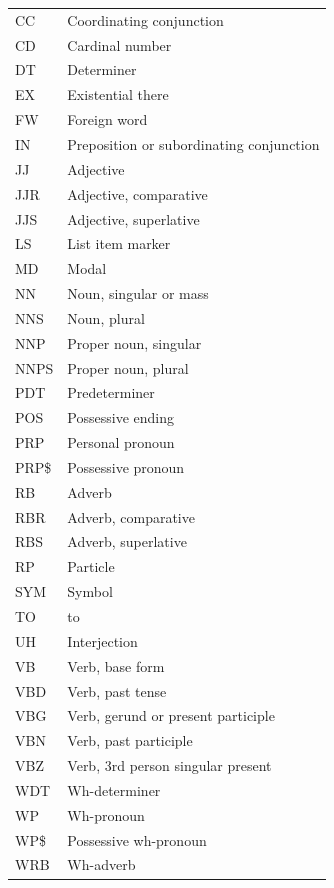 \documentclass[11pt]{article}
\begin{document}
\begin{tabular}{ll}
CC & Coordinating conjunction \\
CD & Cardinal number \\
DT & Determiner \\
EX & Existential there \\
FW & Foreign word \\
IN & Preposition or subordinating conjunction \\
JJ & Adjective \\
JJR & Adjective, comparative \\
JJS & Adjective, superlative \\
LS & List item marker \\
MD & Modal \\
NN & Noun, singular or mass \\
NNS & Noun, plural \\
NNP & Proper noun, singular \\
NNPS & Proper noun, plural \\
PDT & Predeterminer \\
POS & Possessive ending \\
PRP & Personal pronoun \\
PRP\$ & Possessive pronoun \\
RB & Adverb \\
RBR & Adverb, comparative \\
RBS & Adverb, superlative \\
RP & Particle \\
SYM & Symbol \\
TO & to \\
UH & Interjection \\
VB & Verb, base form \\
VBD & Verb, past tense \\
VBG & Verb, gerund or present participle \\
VBN & Verb, past participle \\
VBZ & Verb, 3rd person singular present \\
WDT & Wh-determiner \\
WP & Wh-pronoun \\
WP\$ & Possessive wh-pronoun \\
WRB & Wh-adverb
\end{tabular}
\end{document}

